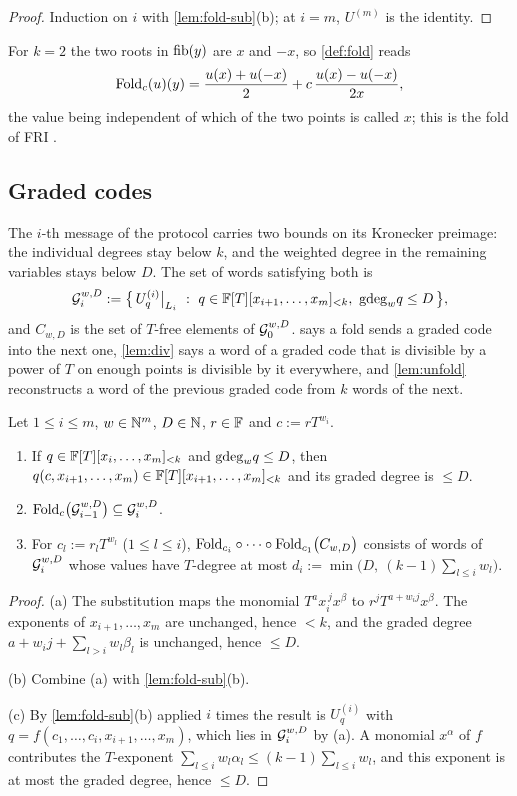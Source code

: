 \begin{proof}
Induction on $i$ with \cref{lem:fold-sub}(b); at $i=m$, $U^{(m)}$ is the identity.
\end{proof}

For $k=2$ the two roots in $\mathrm{fib}(y)$ are $x$ and $-x$, so \cref{def:fold} reads
\[
\mathrm{Fold}_c(u)(y)=\frac{u(x)+u(-x)}{2}+c\,\frac{u(x)-u(-x)}{2x},
\]
the value being independent of which of the two points is called $x$; this is the fold of FRI
\cite{BBHR18}.

\subsection{Graded codes}\label{sec:graded}

The $i$-th message of the protocol carries two bounds on its Kronecker preimage: the individual
degrees stay below $k$, and the weighted degree in the remaining variables stays below $D$. The
set of words satisfying both is
\[
\Gc_i^{w,D}:=\big\{\,U^{(i)}_q\big|_{L_i}\ :\ q\in\F[T][x_{i+1},\dots,x_m]_{<k},\ \gdeg_w q\le D\,\big\},
\]
and $C_{w,D}$ is the set of $T$-free elements of $\mathcal{G}_0^{w,D}$.  says a fold sends
a graded code into the next one, \cref{lem:div} says a word of a graded code that is divisible by
a power of $T$ on enough points is divisible by it everywhere, and \cref{lem:unfold} reconstructs
a word of the previous graded code from $k$ words of the next.

\begin{lemma}[Stability]\label{lem:stab}
Let $1\le i\le m$, $w\in\mathbb{N}^m$, $D\in\mathbb{N}$, $r\in\mathbb{F}$ and $c:=rT^{w_i}$.
\begin{enumerate}
\item[(a)] If $q\in\mathbb{F}[T][x_i,\dots,x_m]_{<k}$ and $\mathrm{gdeg}_w q\le D$, then
$q(c,x_{i+1},\dots,x_m)\in\mathbb{F}[T][x_{i+1},\dots,x_m]_{<k}$ and its graded degree is $\le D$.
\item[(b)] $\mathrm{Fold}_c\big(\mathcal{G}_{i-1}^{w,D}\big)\subseteq\mathcal{G}_i^{w,D}$.
\item[(c)] For $c_l:=r_lT^{w_l}$ ($1\le l\le i$), $\mathrm{Fold}_{c_i}\circ\cdots\circ\mathrm{Fold}_{c_1}\big(C_{w,D}\big)$
consists of words of $\mathcal{G}_i^{w,D}$ whose values have $T$-degree at most
$d_i:=\min\big(D,\ (k-1)\sum_{l\le i}w_l\big)$.
\end{enumerate}
\end{lemma}

\begin{proof}
(a) The substitution maps the monomial $T^ax_i^{\,j}x^\beta$ to $r^jT^{a+w_ij}x^\beta$. The
exponents of $x_{i+1},\dots,x_m$ are unchanged, hence $<k$, and the graded degree
$a+w_ij+\sum_{l>i}w_l\beta_l$ is unchanged, hence $\le D$.

(b) Combine (a) with \cref{lem:fold-sub}(b).

(c) By \cref{lem:fold-sub}(b) applied $i$ times the result is $U^{(i)}_q$ with
$q=f(c_1,\dots,c_i,x_{i+1},\dots,x_m)$, which lies in $\mathcal{G}_i^{w,D}$ by (a). A monomial $x^\alpha$
of $f$ contributes the $T$-exponent $\sum_{l\le i}w_l\alpha_l\le(k-1)\sum_{l\le i}w_l$, and this
exponent is at most the graded degree, hence $\le D$.
\end{proof}

